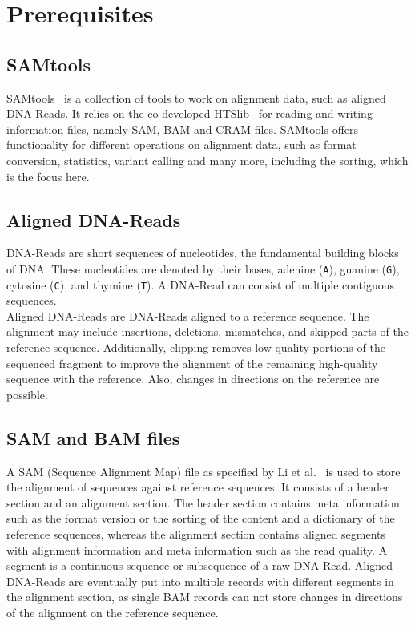 \section{Prerequisites}

\subsection{SAMtools}
SAMtools~\cite{12ySamtools} is a collection of tools to work on alignment data, such as aligned DNA-Reads. It relies on the co-developed HTSlib~\cite{bonfield_htslib_2021} for reading and writing information files, namely SAM, BAM and CRAM files. SAMtools offers functionality for different operations on alignment data, such as format conversion, statistics, variant calling and many more, including the sorting, which is the focus here. 

\subsection{Aligned DNA-Reads}
DNA-Reads are short sequences of nucleotides, the fundamental building blocks of DNA. These nucleotides are denoted by their bases, adenine (\texttt{A}), guanine (\texttt{G}), cytosine (\texttt{C}), and thymine (\texttt{T}). A DNA-Read can consist of multiple contiguous sequences. \\

Aligned DNA-Reads are DNA-Reads aligned to a reference sequence. The alignment may include insertions, deletions, mismatches, and skipped parts of the reference sequence. Additionally, clipping removes low-quality portions of the sequenced fragment to improve the alignment of the remaining high-quality sequence with the reference. Also, changes in directions on the reference are possible.

\subsection{SAM and BAM files}
A SAM (Sequence Alignment Map) file as specified by Li et al.~\cite{samformat} is used to store the alignment of sequences against reference sequences. It consists of a header section and an alignment section. The header section contains meta information such as the format version or the sorting of the content and a dictionary of the reference sequences, whereas the alignment section contains aligned segments with alignment information and meta information such as the read quality. A segment is a continuous sequence or subsequence of a raw DNA-Read. Aligned DNA-Reads are eventually put into multiple records with different segments in the alignment section, as single BAM records can not store changes in directions of the alignment on the reference sequence.\\

